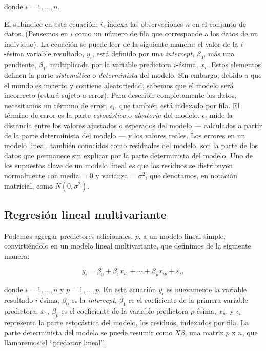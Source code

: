 \documentclass[
]{book}
\begin{document}
donde \(i = 1, \ldots, n.\)

El subíndice en esta ecuación, \(i\), indexa las observaciones \(n\) en el conjunto de datos. (Pensemos en \(i\) como un número de fila que corresponde a los datos de un individuo). La ecuación se puede leer de la siguiente manera: el valor de la \(i\)-ésima variable resultado, \(y_i\), está definido por una \emph{intercept}, \(\beta_0\), más una pendiente, \(\beta_1\), multiplicada por la variable predictora \(i\)-ésima, \(x_i\). Estos elementos definen la parte \emph{sistemática} o \emph{determinista} del modelo. Sin embargo, debido a que el mundo es incierto y contiene aleatoriedad, sabemos que el modelo será incorrecto (estará sujeto a error). Para describir completamente los datos, necesitamos un término de error, \(\epsilon_i\), que también está indexado por fila. El término de error es la parte \emph{estocástica} o \emph{aleatoria} del modelo. \(\epsilon_i\) mide la distancia entre los valores ajustados o esperados del modelo --- calculados a partir de la parte determinista del modelo --- y los valores reales. Los errores en un modelo lineal, también conocidos como residuales del modelo, son la parte de los datos que permanece sin explicar por la parte determinista del modelo. Uno de los supuestos clave de un modelo lineal es que los residuos se distribuyen normalmente con media = 0 y varianza = \(\sigma^2\), que denotamos, en notación matricial, como \(N (0, \sigma ^ 2)\).

\hypertarget{regresiuxf3n-lineal-multivariante}{%
\subsection{Regresión lineal multivariante}\label{regresiuxf3n-lineal-multivariante}}

Podemos agregar predictores adicionales, \(p\), a un modelo lineal simple, convirtiéndolo en un modelo lineal multivariante, que definimos de la siguiente manera:

\[
y_i = \beta_0 + \beta_1 x_ {i1} + \cdots + \beta_p x_ {ip} + \varepsilon_i,
\]

donde \(i = 1, \ldots, n\) y \(p = 1, \ldots, p.\) En esta ecuación \(y_i\) es nuevamente la variable resultado \(i\)-ésima, \(\beta_0\) es la \emph{intercept}, \(\beta_1\) es el coeficiente de la primera variable predictora, \(x_{1}\), \(\beta_p\) es el coeficiente de la variable predictora \(p\)-ésima, \(x_{p}\), y \(\epsilon_i\) representa la parte estocástica del modelo, los residuos, indexados por fila. La parte determinista del modelo se puede resumir como \(X \beta\), una matriz \(p\) x \(n\), que llamaremos el ``predictor lineal''.
\end{document}
